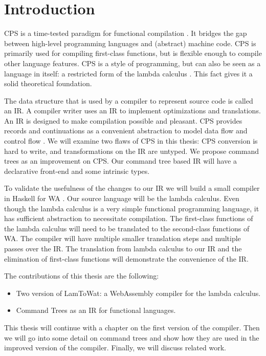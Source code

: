 
\chapter{\label{chap:introduction}Introduction}

CPS is a time-tested paradigm for functional compilation \autocite{steele1978rabbit, DBLP:books/daglib/0022396}. It bridges the gap between high-level programming languages and (abstract) machine code. \ac{CPS} is primarily used for compiling first-class functions, but is flexible enough to compile other language features. \ac{CPS} is a style of programming, but can also be seen as a language in itself: a restricted form of the lambda calculus \autocite{barendregt1984lambda}. This fact gives it a solid theoretical foundation.

The data structure that is used by a compiler to represent source code is called an \ac{IR}. A compiler writer uses an \ac{IR} to implement optimizations and translations. An \ac{IR} is designed to make compilation possible and pleasant. \ac{CPS} provides records and continuations as a convenient abstraction to model data flow and control flow \autocite{bruin2020framevm}. We will examine two flaws of \ac{CPS} in this thesis: \ac{CPS} conversion is hard to write, and transformations on the \ac{IR} are untyped. We propose command trees \autocite{commandtreespoulsen} as an improvement on \ac{CPS}. Our command tree based \ac{IR} will have a declarative front-end and some intrinsic types.

To validate the usefulness of the changes to our \ac{IR} we will build a small compiler in Haskell \autocite{haskellhomepage} for \ac{WA} \autocite{webassemblyhomepage}. Our source language will be the lambda calculus. Even though the lambda calculus is a very simple functional programming language, it has sufficient abstraction to necessitate compilation. The first-class functions of the lambda calculus will need to be translated to the second-class functions of \ac{WA}. The compiler will have multiple smaller translation steps and multiple passes over the \ac{IR}. The translation from lambda calculus to our \ac{IR} and the elimination of first-class functions will demonstrate the convenience of the \ac{IR}.

The contributions of this thesis are the following:
\begin{itemize}
\item Two version of LamToWat: a WebAssembly compiler for the lambda calculus.
\item Command Trees as an \ac{IR} for functional languages.
\end{itemize}

This thesis will continue with a chapter on the first version of the compiler. Then we will go into some detail on command trees and show how they are used in the improved version of the compiler. Finally, we will discuss related work.